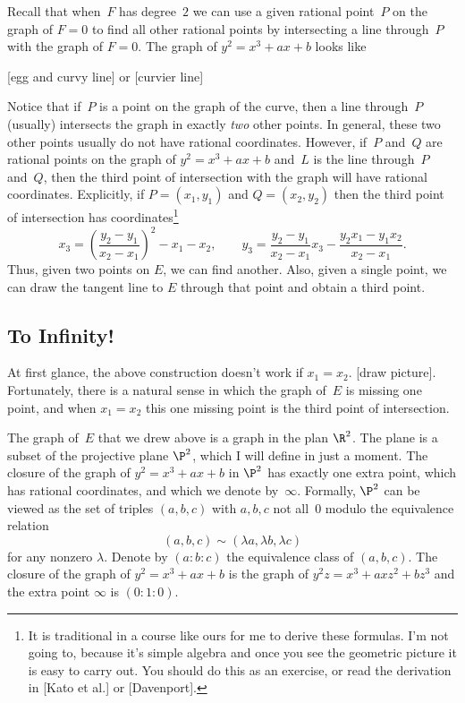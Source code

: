 \documentclass[11pt]{report}
\begin{document}
Recall that when~$F$ has degree~$2$ we can use a given rational
point~$P$ on the graph of $F=0$ to find all other rational points by
intersecting a line through~$P$ with the graph of $F=0$.
The graph of $y^2=x^3+ax+b$ looks like
\begin{center}
  [egg and curvy line] or [curvier line]
\end{center}
Notice that if~$P$ is a point on the graph of the curve, then a line
through~$P$ (usually) intersects the graph in exactly {\em two} other
points.  In general, these two other points usually do not have
rational coordinates.  However, if~$P$ and~$Q$ are rational points on
the graph of $y^2=x^3+ax+b$ and~$L$ is the line through~$P$ and~$Q$,
then the third point of intersection with the graph will have rational
coordinates.  Explicitly, if $P=(x_1,y_1)$ and $Q=(x_2,y_2)$ then the
third point of intersection has coordinates\footnote{It is traditional
  in a course like ours for me to derive these formulas.  I'm not going
  to, because it's simple algebra and once you see the geometric picture
  it is easy to carry out.  You should do this as an exercise, or read
  the derivation in [Kato et al.] or [Davenport].}
$$
  x_3 = \left(\frac{y_2 - y_1}{x_2-x_1}\right)^2 - x_1 - x_2, \qquad
  y_3 = \frac{y_2-y_1}{x_2-x_1} x_3 - \frac{y_2 x_1 - y_1 x_2}{x_2-x_1}.
$$
Thus, given two points on $E$, we can find another.  Also, given a single
point, we can draw the tangent line to $E$ through that point and obtain
a third point.

\subsection{To Infinity!}
At first glance, the above construction doesn't work if $x_1=x_2$.
  [draw picture].  Fortunately, there is a natural sense in which the
graph of~$E$ is missing one point, and when $x_1=x_2$ this one
missing point is the third point of intersection.

The graph of~$E$ that we drew above is a graph in the plan $\R^2$.
The plane is a subset of the projective plane $\P^2$, which I will
define in just a moment. The closure of the graph of $y^2 = x^3 +ax+b$
in $\P^2$ has exactly one extra point, which has rational coordinates,
and which we denote by~$\infty$.
Formally, $\P^2$ can be viewed as the set of triples $(a,b,c)$
with $a,b,c$ not all~$0$ modulo the equivalence relation
$$(a,b,c)\sim (\lambda a ,\lambda b , \lambda c)$$
for any nonzero $\lambda$.
Denote by $(a:b:c)$ the equivalence class of $(a,b,c)$.
The closure of the graph of $y^2 = x^3 + ax+b$ is the
graph of
$
  y^2 z = x^3 + axz^2 + bz^3
$
and the extra point $\infty$ is $(0:1:0)$.
\end{document}
